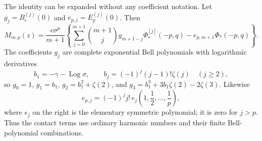 \documentclass[11pt,a4paper]{article}
\numberwithin{equation}{section}
\theoremstyle{definition}
\theoremstyle{remark}
\DeclareMathOperator{\Log}{Log}
\begin{document}
The identity can be expanded without any coefficient notation.
Let $g_j=B_\epsilon^{(j)}(0)$ and $e_{p,j}=E_p^{(j)}(0)$. Then
\begin{equation}\label{res:expanded}
 M_{m,p}(z)=\frac{c\sigma^p}{m+1}
 \left\{\sum_{j=0}^{m+1}\binom{m+1}{j}
     g_{m+1-j}\Phi_*^{[j]}(-p,q)
                 -e_{p,m+1}\Phi_*(-p,q)\right\}.
\end{equation}
The coefficients $g_j$ are complete exponential Bell polynomials
with logarithmic derivatives
\[
 b_1=-\gamma-\Log\sigma,\qquad
 b_j=(-1)^j(j-1)!\zeta(j)\quad(j\ge2),
\]
so $g_0=1$, $g_1=b_1$, $g_2=b_1^2+\zeta(2)$, and
$g_3=b_1^3+3b_1\zeta(2)-2\zeta(3)$.
Likewise
\begin{equation}\label{res:contactcoeff}
 e_{p,j}=(-1)^j j!\,
 e_j\left(1,\frac12,\ldots,\frac1p\right),
\end{equation}
where $e_j$ on the right is the elementary symmetric polynomial;
it is zero for $j>p$. Thus the contact terms use ordinary harmonic
numbers and their finite Bell-polynomial combinations.
\end{document}
